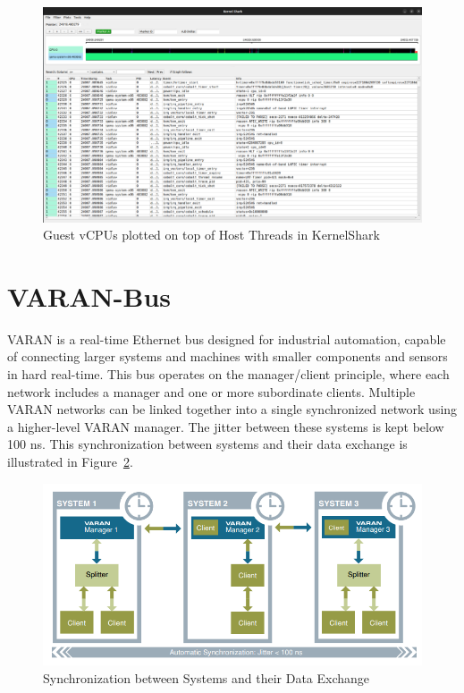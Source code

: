 \documentclass[MMR,Master,english]{style/twbook}
\begin{document}
\begin{figure}[H]
	\centering
	\includegraphics[width=1.0\columnwidth]{img/methodology/kernelshark_combo.png}
	\caption[Guest vCPUs plotted on top of Host Threads in KernelShark]{Guest vCPUs plotted on top of Host Threads in KernelShark}
	\label{fig:kernelshark_combo}
\end{figure}

\section{VARAN-Bus}\label{sec:varan}

VARAN is a real-time Ethernet bus designed for industrial automation, capable of connecting larger systems and machines with smaller components and sensors in hard real-time. This bus operates on the manager/client principle, where each network includes a manager and one or more subordinate clients. Multiple VARAN networks can be linked together into a single synchronized network using a higher-level VARAN manager. The jitter between these systems is kept below 100 ns. This synchronization between systems and their data exchange is illustrated in Figure~\ref{fig:multiple_varans}.

\begin{figure}[H]
	\centering
	\includegraphics[width=0.75\columnwidth]{img/methodology/multiple_varans.png}
	\caption[Synchronization between Systems and their Data Exchange]{Synchronization between Systems and their Data Exchange}
	\label{fig:multiple_varans}
\end{figure}
\end{document}
